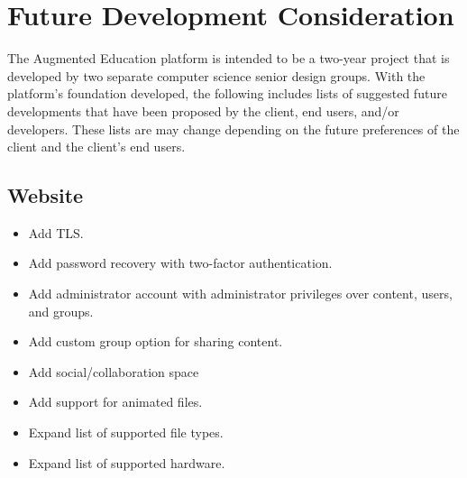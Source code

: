 
\chapter{Future Development Consideration}
\label{ch:TODO}

The Augmented Education platform is intended to be a two-year project that is developed by two separate computer science senior design groups. With the platform's foundation developed, the following includes lists of suggested future developments that have been proposed by the client, end users, and/or developers. These lists are may change depending on the future preferences of the client and the client's end users.

    \section{Website}
    \begin{itemize}
        \item Add TLS.

        \item Add password recovery with two-factor authentication.

        \item Add administrator account with administrator privileges over content, users, and groups.

        \item Add custom group option for sharing content. 

        \item Add social/collaboration space

        \item Add support for animated files. 

        \item Expand list of supported file types. 

        \item Expand list of supported hardware. 

    \end{itemize}


